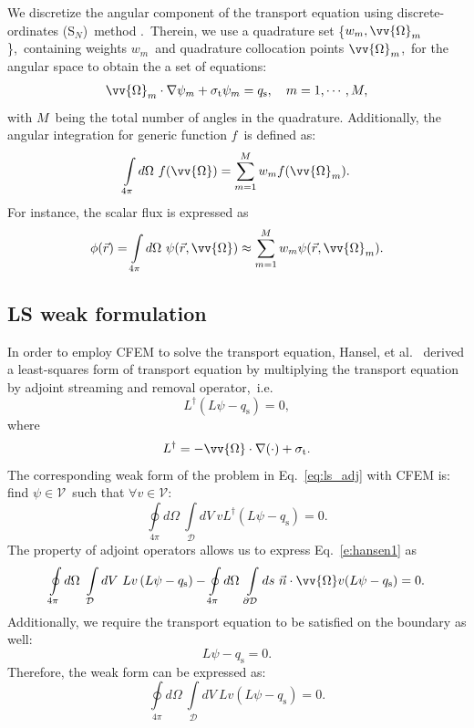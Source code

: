 \documentclass[review]{elsarticle}
\newcommand{\st}{\sigma_\mathrm{t}}
\newcommand{\sn}{S$_N$}
\newcommand{\omen}{\ome\cdot\nabla}
\newcommand{\mm}[1]{\mathrm{#1}}
\newcommand{\pd}{{\partial\mathcal{D}}}
\newcommand{\intli}[1]{\int\limits_{{#1}}}
\newcommand{\ointli}[1]{\oint\limits_{{#1}}}
\newcommand{\slim}[1]{\sum\limits_{\tiny#1}}
\newcommand{\dint}{\oint\limits_{4\pi}d\Omega\ \int\limits_\mathcal{D}dV\ }
\newcommand{\ndo}{\vec{n}\cdot\ome}
\newcommand{\qs}{q_\mathrm{s}}
\newcommand{\ome}{\vv{\Omega}}
\newcommand{\dome}{d\Omega}
\begin{document}
{We discretize the angular component of the transport equation using discrete-ordinates (\sn)\ method \cite{glasstone}.\ Therein, we use a quadrature set \{$w_m,{\ome}_m$\},\ containing weights $w_m$\ and quadrature collocation points ${\ome}_m$,\ for the angular space to obtain the a set of equations:
	\begin{align}
	{\ome}_m\cdot\nabla\psi_m+\st\psi_m=q_\mm{s},\quad m=1,\cdots,M,
	\end{align}
	with $M$\ being the total number of angles in the quadrature. Additionally, the angular integration for generic function $f$\ is defined as:
	\begin{align}
	\intli{4\pi}\dome\ f(\ome)=\slim{m=1}^Mw_mf(\ome_m).
	\end{align}
	For instance, the scalar flux is expressed as
	\begin{align}
	\phi(\vec{r})=\intli{4\pi}\dome\ \psi(\vec{r},\ome)\approx\slim{m=1}^Mw_m\psi(\vec{r},\ome_m).
	\end{align}}

\subsection{LS weak formulation}
In order to employ CFEM to solve the transport equation, Hansel, et al.\ \cite{Hansen:2015jq} derived a least-squares form of transport equation by multiplying the transport equation by adjoint streaming and removal operator,\ i.e.
\begin{equation}\label{eq:ls_adj}
L^\dagger\left(L\psi-\qs\right)=0,
\end{equation}
where
\begin{align}
{L^\dagger = - \omen(\cdot)+\st.}
\end{align}
The corresponding weak form of the problem in  Eq.~\eqref{eq:ls_adj} with CFEM  is: 
find $\psi\in\mathcal{V}$\ such that $\forall v\in\mathcal{V}$:
\begin{equation}\label{e:hansen1}
\dint vL^\dagger\left(L\psi-\qs\right)=0.
\end{equation}
{The property of adjoint operators allows us to express Eq.~\eqref{e:hansen1} as
\begin{equation}\label{eq:weakform_final0}
\dint Lv\left(L\psi-\qs\right)-\ointli{4\pi}\dome\ \intli{\pd}ds\ {\ndo v(L\psi-\qs)}=0.
\end{equation}
Additionally, we require the transport equation to be satisfied on the boundary as well:
\begin{equation}\label{eq:bc0}
L\psi-\qs=0.
\end{equation}
Therefore, the weak form can be expressed as:
\begin{equation}\label{eq:weakform_final}
\dint Lv\left(L\psi-\qs\right)=0.
\end{equation}}
\end{document}
